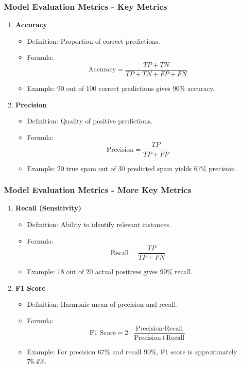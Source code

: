 \documentclass[aspectratio=169]{beamer}
\begin{document}
\begin{frame}[fragile]
    \frametitle{Model Evaluation Metrics - Key Metrics}
    \begin{enumerate}
        \item \textbf{Accuracy}
            \begin{itemize}
                \item Definition: Proportion of correct predictions.
                \item Formula: 
                \[
                \text{Accuracy} = \frac{TP + TN}{TP + TN + FP + FN}
                \]
                \item Example: 90 out of 100 correct predictions gives 90\% accuracy.
            \end{itemize}
        
        \item \textbf{Precision}
            \begin{itemize}
                \item Definition: Quality of positive predictions.
                \item Formula: 
                \[
                \text{Precision} = \frac{TP}{TP + FP}
                \]
                \item Example: 20 true spam out of 30 predicted spam yields \(67\%\) precision.
            \end{itemize}
    \end{enumerate}
\end{frame}

\begin{frame}[fragile]
    \frametitle{Model Evaluation Metrics - More Key Metrics}
    \begin{enumerate}[resume]
        \item \textbf{Recall (Sensitivity)}
            \begin{itemize}
                \item Definition: Ability to identify relevant instances.
                \item Formula: 
                \[
                \text{Recall} = \frac{TP}{TP + FN}
                \]
                \item Example: 18 out of 20 actual positives gives \(90\%\) recall.
            \end{itemize}

        \item \textbf{F1 Score}
            \begin{itemize}
                \item Definition: Harmonic mean of precision and recall.
                \item Formula: 
                \[
                \text{F1 Score} = 2 \cdot \frac{\text{Precision} \cdot \text{Recall}}{\text{Precision} + \text{Recall}}
                \]
                \item Example: For precision \(67\%\) and recall \(90\%\), F1 score is approximately \(76.4\%\).
            \end{itemize}
    \end{enumerate}
\end{frame}
\end{document}
